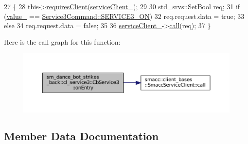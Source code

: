 \begin{DoxyCode}
27   \{
28     this->\hyperlink{classsmacc_1_1ISmaccClientBehavior_a32b16e99e3b4cb289414203dc861a440}{requiresClient}(\hyperlink{classsm__dance__bot__strikes__back_1_1cl__service3_1_1CbService3_ae96f1d34aa0ab6b9bc7099c5c0e512de}{serviceClient\_});
29 
30     std\_srvs::SetBool req;
31     \textcolor{keywordflow}{if} (\hyperlink{classsm__dance__bot__strikes__back_1_1cl__service3_1_1CbService3_a76973df60e0e3ed7d7c270d0701b8f9d}{value\_} == \hyperlink{namespacesm__dance__bot__strikes__back_1_1cl__service3_ac2ccf5d911840620cf8d0443c29d8b6ba13cdca48a01bbb44fa8fb35567fbc58e}{Service3Command::SERVICE3\_ON})
32       req.request.data = \textcolor{keyword}{true};
33     \textcolor{keywordflow}{else}
34       req.request.data = \textcolor{keyword}{false};
35 
36     \hyperlink{classsm__dance__bot__strikes__back_1_1cl__service3_1_1CbService3_ae96f1d34aa0ab6b9bc7099c5c0e512de}{serviceClient\_}->\hyperlink{classsmacc_1_1client__bases_1_1SmaccServiceClient_a0e9914f45f1091c38bb9ad6187d07977}{call}(req);
37   \}
\end{DoxyCode}
Here is the call graph for this function\+:
\nopagebreak
\begin{figure}[H]
\begin{center}
\leavevmode
\includegraphics[width=350pt]{classsm__dance__bot__strikes__back_1_1cl__service3_1_1CbService3_a09a2fda38973e1e3915b63a47ca67ed1_cgraph}
\end{center}
\end{figure}


\subsection{Member Data Documentation}
\mbox{\label{classsm__dance__bot__strikes__back_1_1cl__service3_1_1CbService3_ae96f1d34aa0ab6b9bc7099c5c0e512de}} 
